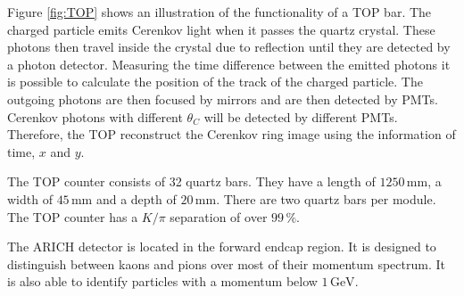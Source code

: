 \documentclass[a4paper,11pt,twosided,final,german,openbib,pdftex,listof=totoc,bibliography=totoc]{scrbook}
\begin{document}
Figure \ref{fig:TOP} shows an illustration of the functionality of a TOP bar. The charged particle emits Cerenkov light when it passes the quartz crystal. These photons then travel inside the crystal due to reflection until they are detected by a photon detector. Measuring the time difference between the emitted photons it is possible to calculate the position of the track of the charged particle. The outgoing photons are then focused by mirrors and are then detected by PMTs. Cerenkov photons with different $\theta_C$ will be detected by different PMTs. Therefore, the TOP reconstruct the Cerenkov ring image using the information of time, $x$ and $y$.\cite{B2TR} 

The TOP counter consists of 32 quartz bars. They have a length of $1250\,\textrm{mm}$, a width of $45\,\textrm{mm}$ and a depth of $20\,\textrm{mm}$. There are two quartz bars per module. The TOP counter has a $K/\pi$ separation of over $99\,\%$.\cite{B2TR}

The ARICH detector is located in the forward endcap region. It is designed to distinguish between kaons and pions over most of their momentum spectrum. It is also able to identify particles with a momentum below $1\,\textrm{GeV}$.
\end{document}
